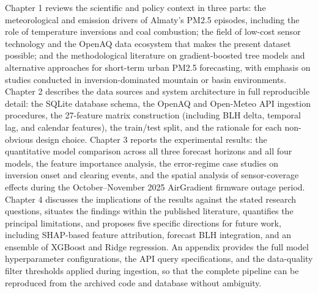 Chapter 1 reviews the scientific and policy context in three parts: the meteorological and emission drivers of Almaty's PM2.5 episodes, including the role of temperature inversions and coal combustion; the field of low-cost sensor technology and the OpenAQ data ecosystem that makes the present dataset possible; and the methodological literature on gradient-boosted tree models and alternative approaches for short-term urban PM2.5 forecasting, with emphasis on studies conducted in inversion-dominated mountain or basin environments. Chapter 2 describes the data sources and system architecture in full reproducible detail: the SQLite database schema, the OpenAQ and Open-Meteo API ingestion procedures, the 27-feature matrix construction (including BLH delta, temporal lag, and calendar features), the train/test split, and the rationale for each non-obvious design choice. Chapter 3 reports the experimental results: the quantitative model comparison across all three forecast horizons and all four models, the feature importance analysis, the error-regime case studies on inversion onset and clearing events, and the spatial analysis of sensor-coverage effects during the October--November 2025 AirGradient firmware outage period. Chapter 4 discusses the implications of the results against the stated research questions, situates the findings within the published literature, quantifies the principal limitations, and proposes five specific directions for future work, including SHAP-based feature attribution, forecast BLH integration, and an ensemble of XGBoost and Ridge regression. An appendix provides the full model hyperparameter configurations, the API query specifications, and the data-quality filter thresholds applied during ingestion, so that the complete pipeline can be reproduced from the archived code and database without ambiguity.
